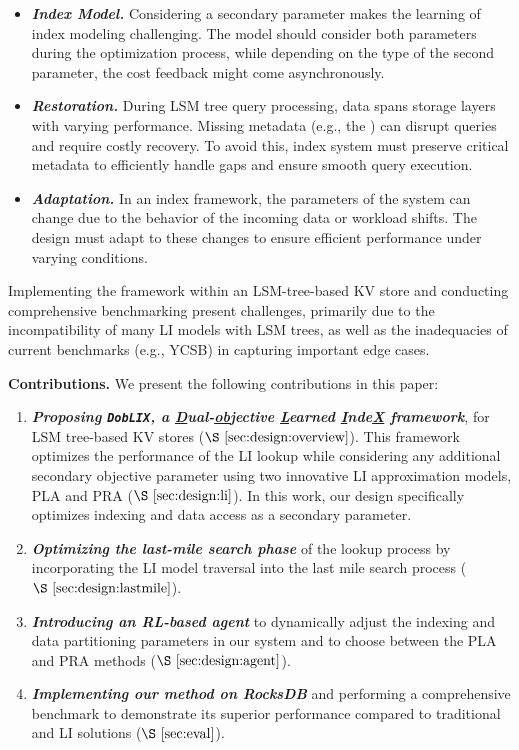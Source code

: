 \begin{itemize}[noitemsep, leftmargin=*]
    \item \textit{\textbf{Index Model.}} Considering a secondary parameter makes the learning of index modeling challenging. The model should consider both parameters during the optimization process, while depending on the type of the second parameter, the cost feedback might come asynchronously.
    \item  \textit{\textbf{Restoration.}} During LSM tree query processing, data spans storage layers with varying performance. Missing metadata (e.g., the ) can disrupt queries and require costly recovery. To avoid this, index system must preserve critical metadata to efficiently handle gaps and ensure smooth query execution.
    \item  \textit{\textbf{Adaptation.}} In an index framework, the parameters of the system can change due to the behavior of the incoming data or workload shifts. The design must adapt to these changes to ensure efficient performance under varying conditions.
\end{itemize}

\noindent Implementing the framework within an LSM-tree-based KV store and conducting comprehensive benchmarking present challenges, primarily due to the incompatibility of many LI models with LSM trees, as well as the inadequacies of current benchmarks (e.g., YCSB) in capturing important edge cases.

\vspace{3pt}
\noindent
\textbf{Contributions.} We present the following contributions in this paper:
\begin{enumerate}[noitemsep, leftmargin=*]
    \item \textbf{\textit{Proposing \texttt{DobLIX}, a \underline{D}ual-\underline{ob}jective \underline{L}earned \underline{I}nde\underline{X} framework}}, for LSM tree-based KV stores ($\S~\ref{sec:design:overview}$). This framework optimizes the performance of the LI lookup while considering any additional secondary objective parameter using two innovative LI approximation models, PLA and PRA ($\S~\ref{sec:design:li}$). In this work, our design specifically optimizes indexing and data access as a secondary parameter.
    \item \textbf{\textit{Optimizing the last-mile search phase}} of the lookup process by incorporating the LI model traversal into the last mile search process ($\S~\ref{sec:design:lastmile}$).
    \item \textbf{\textit{Introducing an RL-based agent}} to dynamically adjust the indexing and data partitioning parameters in our system and to choose between the PLA and PRA methods ($\S~\ref{sec:design:agent}$).
    \item \textbf{\textit{Implementing our method on RocksDB}} and performing a comprehensive benchmark to demonstrate its superior performance compared to traditional and LI solutions ($\S~\ref{sec:eval}$).
\end{enumerate}

